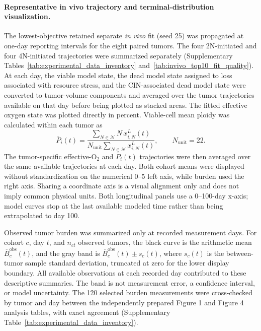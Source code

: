 \documentclass[11pt]{article}
\begin{document}
\paragraph{Representative in vivo trajectory and terminal-distribution visualization.}
The lowest-objective retained separate \textit{in vivo} fit (seed 25) was propagated at one-day reporting intervals for the eight paired tumors. The four 2N-initiated and four 4N-initiated trajectories were summarized separately (Supplementary Tables~\ref{tab:experimental_data_inventory} and~\ref{tab:invivo_top10_fit_quality}). At each day, the viable model state, the dead model state assigned to loss associated with resource stress, and the CIN-associated dead model state were converted to tumor-volume components and averaged over the tumor trajectories available on that day before being plotted as stacked areas. The fitted effective oxygen state was plotted directly in percent. Viable-cell mean ploidy was calculated within each tumor as
\begin{equation}
\overline{P}_i(t)=
\frac{\sum_{N\in\mathcal N}N\,x^L_{i,N}(t)}
{N_{\mathrm{unit}}\sum_{N\in\mathcal N}x^L_{i,N}(t)},
\qquad N_{\mathrm{unit}}=22.
\label{eq:appendix_invivo_mean_ploidy_display}
\end{equation}
The tumor-specific effective-O$_2$ and \(\overline{P}_i(t)\) trajectories were then averaged over the same available trajectories at each day. Both cohort means were displayed without standardization on the numerical 0--5 left axis, while burden used the right axis. Sharing a coordinate axis is a visual alignment only and does not imply common physical units. Both longitudinal panels use a 0--100-day x-axis; model curves stop at the last available modeled time rather than being extrapolated to day 100.

Observed tumor burden was summarized only at recorded measurement days. For cohort \(c\), day \(t\), and \(n_{ct}\) observed tumors, the black curve is the arithmetic mean \(\overline{B}^{\mathrm{obs}}_c(t)\), and the gray band is \(\overline{B}^{\mathrm{obs}}_c(t)\pm s_c(t)\), where \(s_c(t)\) is the between-tumor sample standard deviation, truncated at zero for the lower display boundary. All available observations at each recorded day contributed to these descriptive summaries. The band is not measurement error, a confidence interval, or model uncertainty. The 120 selected burden measurements were cross-checked by tumor and day between the independently prepared Figure 1 and Figure 4 analysis tables, with exact agreement (Supplementary Table~\ref{tab:experimental_data_inventory}).
\end{document}
